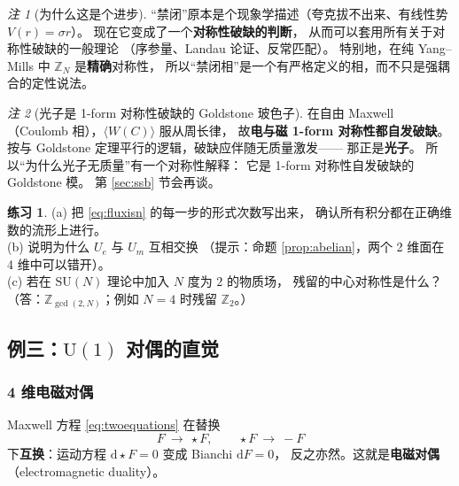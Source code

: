 \documentclass[UTF8,a4paper,11pt]{ctexart}
\theoremstyle{plain}
\theoremstyle{definition}
\newtheorem{exercise}{练习}[section]
\theoremstyle{remark}
\newtheorem{remark}{注}[section]
\newcommand{\ext}{\mathrm{d}}          %
\newcommand{\hs}{\star}                %
\newcommand{\ZZ}{\mathbb{Z}}
\newcommand{\Uone}{\mathrm{U}(1)}
\newcommand{\SUgrp}{\mathrm{SU}}
\newcommand{\en}[1]{\textsf{#1}}       %
\newcommand{\Uop}{U}
\begin{document}
\begin{remark}[为什么这是个进步]
“禁闭”原本是个现象学描述（夸克拔不出来、有线性势 $V(r)=\sigma r$）。
现在它变成了一个\textbf{对称性破缺的判断}，
从而可以套用所有关于对称性破缺的一般理论
（序参量、Landau 论证、反常匹配）。
特别地，在纯 Yang--Mills 中 $\ZZ_N$ 是\textbf{精确}对称性，
所以“禁闭相”是一个有严格定义的相，而不只是强耦合的定性说法。
\end{remark}

\begin{remark}[光子是 1-form 对称性破缺的 Goldstone 玻色子]
在自由 Maxwell（Coulomb 相），$\langle W(C)\rangle$ 服从周长律，
故\textbf{电与磁 1-form 对称性都自发破缺}。
按与 Goldstone 定理平行的逻辑，破缺应伴随无质量激发——
那正是\textbf{光子}。
所以“为什么光子无质量”有一个对称性解释：
它是 1-form 对称性自发破缺的 Goldstone 模。
第 \ref{sec:ssb} 节会再谈。
\end{remark}

\begin{exercise}
\label{ex:maxwell}
(a) 把 \eqref{eq:fluxisn} 的每一步的形式次数写出来，
确认所有积分都在正确维数的流形上进行。\\
(b) 说明为什么 $\Uop_e$ 与 $\Uop_m$ 互相交换
（提示：命题 \ref{prop:abelian}，两个 2 维面在 4 维中可以错开）。\\
(c) 若在 $\SUgrp(N)$ 理论中加入 $N$ 度为 $2$ 的物质场，
残留的中心对称性是什么？
（答：$\ZZ_{\gcd(2,N)}$；例如 $N=4$ 时残留 $\ZZ_2$。）
\end{exercise}

\subsection{例三：\texorpdfstring{$\Uone$}{U(1)} 对偶的直觉}
\label{subsec:duality}

\subsubsection{4 维电磁对偶}

Maxwell 方程 \eqref{eq:twoequations} 在替换
\begin{equation}
  F\ \longrightarrow\ \hs F,
  \qquad \hs F\ \longrightarrow\ -F
  \label{eq:EMduality}
\end{equation}
下\textbf{互换}：运动方程 $\ext\hs F=0$ 变成 Bianchi $\ext F=0$，
反之亦然。这就是\textbf{电磁对偶}（\en{electromagnetic duality}）。
\end{document}
